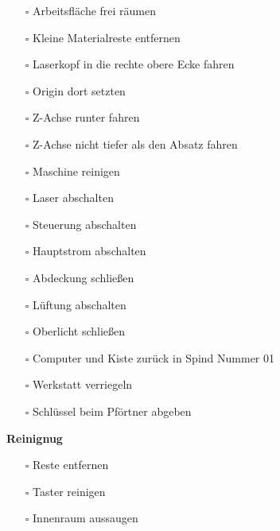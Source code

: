 \documentclass[]{article}
\providecommand{\tightlist}{%
  \setlength{\itemsep}{0pt}\setlength{\parskip}{0pt}}
\begin{document}
\begin{itemize}
\tightlist
\item[$\square$]
  Arbeitsfläche frei räumen\\
\item[$\square$]
  Kleine Materialreste entfernen\\
\item[$\square$]
  Laserkopf in die rechte obere Ecke fahren\\
\item[$\square$]
  Origin dort setzten\\
\item[$\square$]
  Z-Achse runter fahren\\
\item[$\square$]
  Z-Achse nicht tiefer als den Absatz fahren\\
\item[$\square$]
  Maschine reinigen\\
\item[$\square$]
  Laser abschalten\\
\item[$\square$]
  Steuerung abschalten\\
\item[$\square$]
  Hauptstrom abschalten\\
\item[$\square$]
  Abdeckung schließen\\
\item[$\square$]
  Lüftung abschalten\\
\item[$\square$]
  Oberlicht schließen\\
\item[$\square$]
  Computer und Kiste zurück in Spind Nummer 01\\
\item[$\square$]
  Werkstatt verriegeln\\
\item[$\square$]
  Schlüssel beim Pförtner abgeben
\end{itemize}

\textbf{Reinignug}

\begin{itemize}
\tightlist
\item[$\square$]
  Reste entfernen
\item[$\square$]
  Taster reinigen
\item[$\square$]
  Innenraum aussaugen
\end{itemize}
\end{document}
